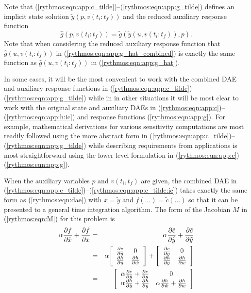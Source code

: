 \documentclass[pdf,ps2pdf,11pt]{SANDreport}
\begin{document}
Note that (\ref{rythmos:eqn:app:c_tilde})--(\ref{rythmos:eqn:app:g_tilde})
defines an implicit state solution $\tilde{y}(p,v(t_i:t_f))$ and the reduced auxiliary
response function
%
\begin{equation}
\hat{g}(p,v(t_i:t_f)) = \tilde{g}(\tilde{y}(u,v(t_i:t_f)),p).
\label{rythmos:eqn:app:g_hat_combined}
\end{equation}
%
Note that when considering the reduced auxiliary response function that
$\hat{g}(u,v(t_i:t_f))$ in (\ref{rythmos:eqn:app:g_hat_combined}) is exactly
the same function as $\hat{g}(u,v(t_i:t_f))$ in (\ref{rythmos:eqn:app:g_hat}).

In some cases, it will be the most convenient to work with the combined DAE
and auxiliary response functions in
(\ref{rythmos:eqn:app:c_tilde})--(\ref{rythmos:eqn:app:g_tilde}) while in in
other situations it will be most clear to work with the original state and
auxiliary DAEs in (\ref{rythmos:eqn:app:c})--(\ref{rythmos:eqn:app:h:ic}) and
response functions (\ref{rythmos:eqn:app:g}).  For example, mathematical
derivations for various sensitivity computations are most readily followed
using the more abstract form in
(\ref{rythmos:eqn:app:c_tilde})--(\ref{rythmos:eqn:app:g_tilde}) while
describing requirements from applications is most straightforward using the
lower-level formulation in
(\ref{rythmos:eqn:app:c})--(\ref{rythmos:eqn:app:g}).

When the auxiliary variables $p$ and $v(t_i,t_f)$ are given, the combined DAE
in (\ref{rythmos:eqn:app:c_tilde})--(\ref{rythmos:eqn:app:c_tilde:ic}) takes
exactly the same form as (\ref{rythmos:eqn:dae}) with $x = \tilde{y}$ and
$f(\ldots) = \tilde{c}(\ldots)$ so that it can be presented to a general time
integration algorithm.  The form of the Jacobian $M$ in (\ref{rythmos:eqn:M})
for this problem is
%
\begin{eqnarray}
\alpha \frac{\partial f}{\partial \dot{x}} + \frac{\partial f}{\partial x}
& = & \alpha \frac{\partial \tilde{c}}{\partial \dot{\tilde{y}}} + \frac{\partial \tilde{c}}{\partial \tilde{y}} \nonumber \\
& = & \alpha {\bmat{cc}
          \frac{\partial c}{\partial \dot{y}} & 0 \\
          \frac{\partial h}{\partial \dot{y}} & \frac{\partial h}{\partial \dot{w}}
       \emat}
       + {\bmat{cc}
          \frac{\partial c}{\partial y} & 0 \\
          \frac{\partial h}{\partial y} & \frac{\partial h}{\partial  w}
       \emat} \nonumber \\
& = & {\bmat{cc}
      \alpha \frac{\partial c}{\partial \dot{y}} + \frac{\partial c}{\partial y}
      & 0 \\
      \alpha \frac{\partial h}{\partial \dot{y}} + \frac{\partial h}{\partial y}
      & \alpha \frac{\partial h}{\partial \dot{w}} + \frac{\partial h}{\partial w}
       \emat} \label{rythmos:eqn:c_tilde_jac}
\end{eqnarray}
\end{document}
